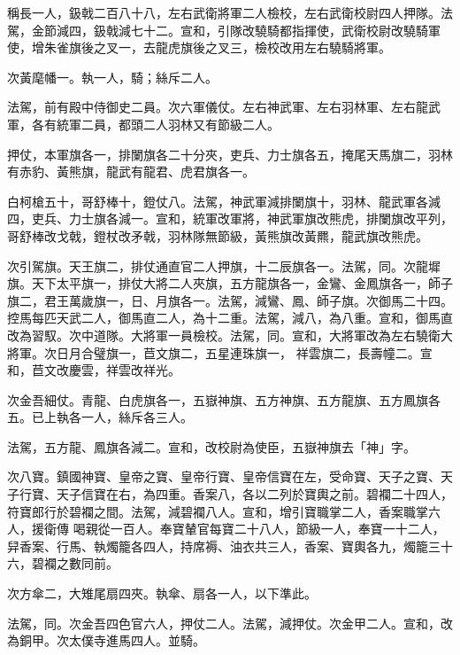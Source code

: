 \begin{pinyinscope}
 稱長一人，鈒戟二百八十八，左右武衛將軍二人檢校，左右武衛校尉四人押隊。法駕，金節減四，鈒戟減七十二。宣和，引隊改驍騎都指揮使，武衛校尉改驍騎軍使，增朱雀旗後之叉一，去龍虎旗後之叉三，檢校改用左右驍騎將軍。



 次黃麾幡一。執一人，騎；絲斥二人。



 法駕，前有殿中侍御史二員。次六軍儀仗。左右神武軍、左右羽林軍、左右龍武軍，各有統軍二員，都頭二人羽林又有節級二人。



 押仗，本軍旗各一，排闌旗各二十分夾，吏兵、力士旗各五，掩尾天馬旗二，羽林有赤豹、黃熊旗，龍武有龍君、虎君旗各一。



 白柯槍五十，哥舒棒十，鐙仗八。法駕，神武軍減排闌旗十，羽林、龍武軍各減四，吏兵、力士旗各減一。宣和，統軍改軍將，神武軍旗改熊虎，排闌旗改平列，哥舒棒改戈戟，鐙杖改矛戟，羽林隊無節級，黃熊旗改黃羆，龍武旗改熊虎。



 次引駕旗。天王旗二，排仗通直官二人押旗，十二辰旗各一。法駕，同。次龍墀旗。天下太平旗一，排仗大將二人夾旗，五方龍旗各一，金鸞、金鳳旗各一，師子旗二，君王萬歲旗一，日、月旗各一。法駕，減鸞、鳳、師子旗。次御馬二十四。控馬每匹天武二人，御馬直二人，為十二重。法駕，減八，為八重。宣和，御馬直改為習馭。次中道隊。大將軍一員檢校。法駕，同。宣和，大將軍改為左右驍衛大將軍。次日月合璧旗一，苣文旗二，五星連珠旗一，
 祥雲旗二，長壽幢二。宣和，苣文改慶雲，祥雲改祥光。



 次金吾細仗。青龍、白虎旗各一，五嶽神旗、五方神旗、五方龍旗、五方鳳旗各五。已上執各一人，絲斥各三人。



 法駕，五方龍、鳳旗各減二。宣和，改校尉為使臣，五嶽神旗去「神」字。



 次八寶。鎮國神寶、皇帝之寶、皇帝行寶、皇帝信寶在左，受命寶、天子之寶、天子行寶、天子信寶在右，為四重。香案八，各以二列於寶輿之前。碧襴二十四人，符寶郎行於碧襴之間。法駕，減碧襴八人。宣和，增引寶職掌二人，香案職掌六人，援衛傳
 喝親從一百人。奉寶輦官每寶二十八人，節級一人，奉寶一十二人，舁香案、行馬、執燭籠各四人，持席褥、油衣共三人，香案、寶輿各九，燭籠三十六，碧襴之數同前。



 次方傘二，大雉尾扇四夾。執傘、扇各一人，以下準此。



 法駕，同。次金吾四色官六人，押仗二人。法駕，減押仗。次金甲二人。宣和，改為銅甲。次太僕寺進馬四人。並騎。




\end{pinyinscope}
